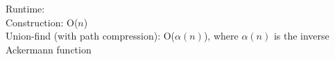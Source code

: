 
Runtime: \\
\indent Construction: O($n$) \\
\indent Union-find (with path compression): O($\alpha (n)$), where $\alpha (n)$ is the inverse Ackermann function



\newpage